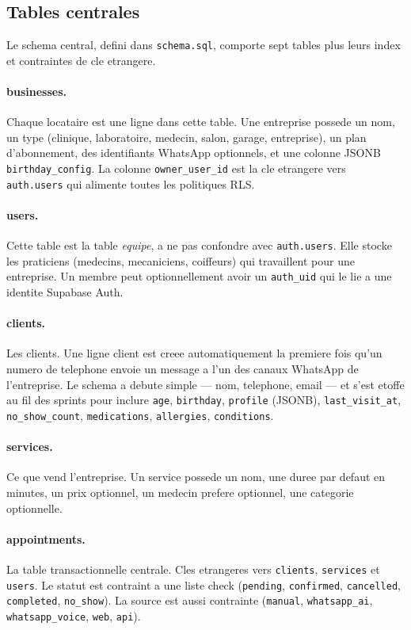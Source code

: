 \subsection{Tables centrales}
Le schema central, defini dans \texttt{schema.sql}, comporte sept tables
plus leurs index et contraintes de cle etrangere.

\paragraph{businesses.} Chaque locataire est une ligne dans cette table.
Une entreprise possede un nom, un type (clinique, laboratoire, medecin,
salon, garage, entreprise), un plan d'abonnement, des identifiants
WhatsApp optionnels, et une colonne JSONB \texttt{birthday\_config}. La
colonne \texttt{owner\_user\_id} est la cle etrangere vers
\texttt{auth.users} qui alimente toutes les politiques RLS.

\paragraph{users.} Cette table est la table \emph{equipe}, a ne pas
confondre avec \texttt{auth.users}. Elle stocke les praticiens (medecins,
mecaniciens, coiffeurs) qui travaillent pour une entreprise. Un membre
peut optionnellement avoir un \texttt{auth\_uid} qui le lie a une
identite Supabase Auth.

\paragraph{clients.} Les clients. Une ligne client est creee
automatiquement la premiere fois qu'un numero de telephone envoie un
message a l'un des canaux WhatsApp de l'entreprise. Le schema a debute
simple --- nom, telephone, email --- et s'est etoffe au fil des sprints
pour inclure \texttt{age}, \texttt{birthday}, \texttt{profile} (JSONB),
\texttt{last\_visit\_at}, \texttt{no\_show\_count},
\texttt{medications}, \texttt{allergies}, \texttt{conditions}.

\paragraph{services.} Ce que vend l'entreprise. Un service possede un
nom, une duree par defaut en minutes, un prix optionnel, un medecin
prefere optionnel, une categorie optionnelle.

\paragraph{appointments.} La table transactionnelle centrale. Cles
etrangeres vers \texttt{clients}, \texttt{services} et \texttt{users}.
Le statut est contraint a une liste check (\texttt{pending},
\texttt{confirmed}, \texttt{cancelled}, \texttt{completed},
\texttt{no\_show}). La source est aussi contrainte
(\texttt{manual}, \texttt{whatsapp\_ai}, \texttt{whatsapp\_voice},
\texttt{web}, \texttt{api}).

